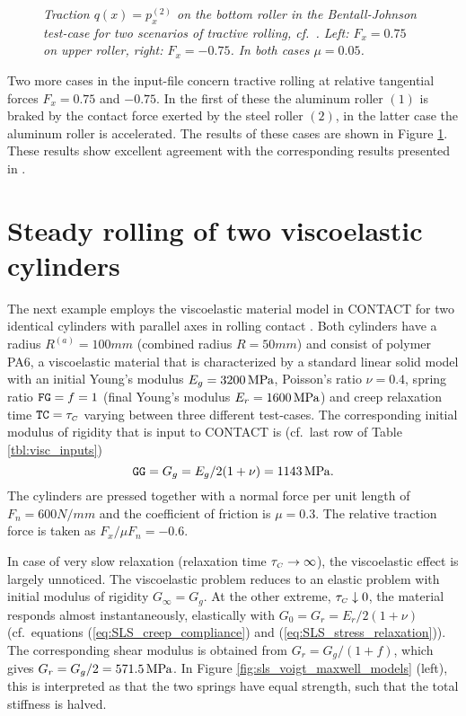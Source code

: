 \documentclass[12pt]{report}
\begin{document}
\begin{figure}[bt]
\centering
{}
\caption{\em Traction $q(x)=p_x^{(2)}$ on the bottom roller in the
Bentall-Johnson test-case for two scenarios of tractive rolling, cf.\
\cite[Fig.9]{Bentall1967}. Left: $F_x=0.75$ on upper roller, right:
$F_x=-0.75$. In both cases $\mu=0.05$.}
\label{fig:bentall_tractive}
\end{figure}

Two more cases in the input-file concern tractive rolling at relative
tangential forces $F_x=0.75$ and $-0.75$. In the first of these the
aluminum roller $(1)$ is braked by the contact force exerted by the steel
roller $(2)$, in the latter case the aluminum roller is accelerated.
The results of these cases are shown in Figure \ref{fig:bentall_tractive}.
These results show excellent agreement with the corresponding results
presented in \cite[Fig.9]{Bentall1967}.

\section{Steady rolling of two viscoelastic cylinders}
\label{sec:ex_visc}

The next example employs the viscoelastic material model in CONTACT for two
identical cylinders with parallel axes in rolling contact
\cite{Wang_guangqiu1993}. Both cylinders have a radius
$R^{(a)}=100\unit{mm}$
(combined radius $R=50\unit{mm}$) and consist of polymer PA6, a viscoelastic
material that is characterized by a standard linear solid model with an
initial Young's modulus $E_g=3200\,\mathrm{MPa}$, Poisson's ratio $\nu=0.4$,
spring ratio ${\tt FG}=f=1$ (final Young's modulus $E_r=1600\,\mathrm{MPa}$) and
creep relaxation time ${\tt TC}=\tau_{\scriptscriptstyle C}$ varying between three different
test-cases. The corresponding initial modulus of rigidity that is input to
CONTACT is (cf.\ last row of Table \ref{tbl:visc_inputs})
\begin{equation}
        {\tt GG} =G_g = E_g/2(1+\nu) = 1143\,\mathrm{MPa} .
\end{equation}
The cylinders are pressed together with a normal force per unit length
of $F_n = 600\unit{N/mm}$ and the coefficient of friction is $\mu = 0.3$. The
relative traction force is taken as $F_x/\mu F_n = -0.6$.

In case of very slow relaxation (relaxation time $\tau_{\scriptscriptstyle C}\rightarrow\infty$),
the viscoelastic effect is largely unnoticed. The viscoelastic problem reduces
to an elastic problem with initial modulus of rigidity $G_{\infty} = G_g$.
At the other extreme, $\tau_{\scriptscriptstyle C}\downarrow 0$, the material responds almost
instantaneously, elastically with $G_0=G_r=E_r/2(1+\nu)$ (cf.\ equations
(\ref{eq:SLS_creep_compliance}) and (\ref{eq:SLS_stress_relaxation})).
The corresponding shear modulus is obtained from $G_r=G_g/(1+f)$, which
gives $G_r=G_g/2=571.5\,\mathrm{MPa}$. In Figure
\ref{fig:sls_voigt_maxwell_models} (left), this is interpreted as that
the two springs have equal strength, such that the total stiffness is
halved.
\end{document}
